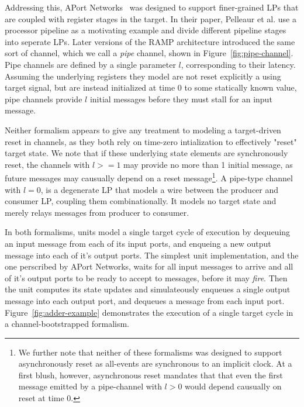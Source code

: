 Addressing this, APort Networks~\cite{APortNetworks} was designed to support
finer-grained LPs that are coupled with register stages in the target. In their
paper, Pelleaur et al. use a processor pipeline as a motivating example and
divide different pipeline stages into seperate LPs. Later versions of the RAMP
architecture introduced the same sort of channel, which we call a \emph{pipe}
channel, shown in Figure~\ref{fig:pipe-channel}.  Pipe channels are defined by
a single parameter $l$, corresponding to their latency. Assuming the underlying
registers they model are not reset explicitly a using target signal, but are
instead initialized at time 0 to some statically known value, pipe channels
provide $l$ initial messages before they must stall for an input message.

Neither formalism appears to give any treatment to modeling a target-driven reset in
channels, as they both rely on time-zero intialization to effectively
"reset" target state.  We note that if these underlying state elements are
synchronously reset, the channels with $l >= 1$ may provide no more than 1
initial message, as future messages may causually depend on a reset
message\footnote{We further note that neither of these formalisms was designed
to support asynchronously reset as all-events are synchronous to an implicit
clock. At a first blush, however, asynchronous reset mandates that that even
the first message emitted by a pipe-channel with $l > 0$ would depend causually
on reset at time 0.}. A pipe-type channel with $l = 0$, is a degenerate LP that models a wire between the producer and consumer LP, coupling them combinationally.
It models no target state and merely relays messages from producer to consumer.

In both formalisms, units model a single target cycle of execution by dequeuing an input message
from each of its input ports, and enqueing a new output message into each of
it's output ports. The simplest unit implementation, and the one perscribed by
APort Networks, waits for all input messages to arrive and all of it's output
ports to be ready to accept to messages, before it may \emph{fire}. Then the
unit computes its state updates and simulateously enqueues a single output
message into each output port, and dequeues a message from each input port.
Figure~\ref{fig:adder-example} demonstrates the execution of a single target cycle in a channel-bootstrapped formalism.

